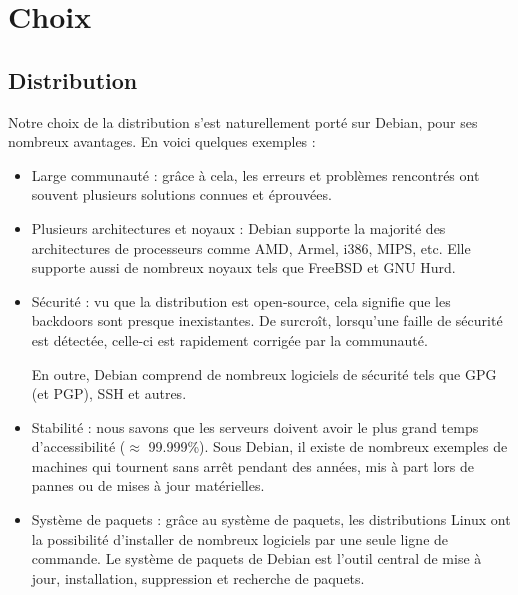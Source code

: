 
\section{Choix}
\label{sec:choix}

\subsection{Distribution}
\label{subsec:distribution}

Notre choix de la distribution s'est naturellement porté sur Debian, pour ses
nombreux avantages. En voici quelques exemples :

\begin{itemize}
    \item Large communauté : grâce à cela, les erreurs et problèmes rencontrés ont
      souvent plusieurs solutions connues et éprouvées.

    \item Plusieurs architectures et noyaux : Debian supporte la majorité des
      architectures de processeurs comme AMD, Armel, i386, MIPS, etc. Elle supporte
      aussi de nombreux noyaux tels que FreeBSD et GNU Hurd.

    \item Sécurité : vu que la distribution est open-source, cela signifie que les
      backdoors sont presque inexistantes. De surcroît, lorsqu'une faille de sécurité
      est détectée, celle-ci est rapidement corrigée par la communauté.

      En outre, Debian comprend de nombreux logiciels de sécurité tels que GPG (et
      PGP), SSH et autres.

    \item Stabilité : nous savons que les serveurs doivent avoir le plus grand temps
    d'accessibilité ($\approx$ 99.999\%). Sous Debian, il existe de nombreux exemples de
    machines qui tournent sans arrêt pendant des années, mis à part lors de pannes
    ou de mises à jour matérielles.

    \item Système de paquets : grâce au système de paquets, les distributions Linux
    ont la possibilité d'installer de nombreux logiciels par une seule ligne de
    commande. Le système de paquets de Debian est l'outil central de mise à jour,
    installation, suppression et recherche de paquets.
\end{itemize}

